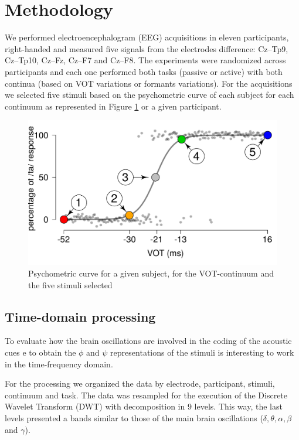 \section*{Methodology}
\label{sec:Methodology} 

We performed electroencephalogram (EEG) acquisitions in eleven participants,
right-handed and measured five signals from the electrodes difference: Cz--Tp9,
Cz--Tp10, Cz--Fz, Cz--F7 and Cz--F8. The experiments were randomized across
participants and each one performed both tasks (passive or active) with both
continua (based on VOT variations or formants variations). For the acquisitions
we selected five stimuli based on the psychometric curve of each subject for
each continuum as represented in Figure \ref{psy} or a given participant.

\begin{figure}
\centering
\includegraphics[width=\linewidth]{imgs/VOT-S04.pdf}
\caption{Psychometric curve for a given subject, for the VOT-continuum and the
five stimuli selected} \label{psy}
\end{figure}


\subsection*{Time-domain processing}

To evaluate how the brain oscillations are involved in the coding of the
acoustic cues e to obtain the $\phi$ and $\psi$ representations of the stimuli
is interesting to work in the time-frequency domain.

For the processing we organized the data by electrode, participant, stimuli,
continuum and task. The data was resampled for the execution of the Discrete
Wavelet Transform (DWT) with decomposition in 9 levels. This way, the last
levels presented a bands similar to those of the main brain oscillations
($\delta, \theta, \alpha, \beta$ and $\gamma$).

